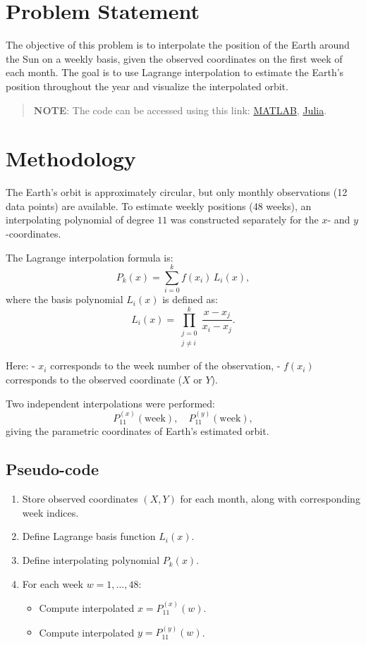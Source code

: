 \section*{Problem Statement}
The objective of this problem is to interpolate the position of the Earth around the Sun on a weekly basis, given the observed coordinates on the first week of each month. The goal is to use Lagrange interpolation to estimate the Earth’s position throughout the year and visualize the interpolated orbit.

\begin{quote}
  \textbf{NOTE}: The code can be accessed using this link: \href{https://raw.githubusercontent.com/HavokSahil/computational-techniques-assignments/refs/heads/main/assignment3/a2.m}{MATLAB}, \href{https://raw.githubusercontent.com/HavokSahil/computational-techniques-assignments/refs/heads/main/assignment3/a2.jl}{Julia}.
\end{quote}
\section*{Methodology}
The Earth’s orbit is approximately circular, but only monthly observations (12 data points) are available. To estimate weekly positions (48 weeks), an interpolating polynomial of degree $11$ was constructed separately for the $x$- and $y$-coordinates.

The Lagrange interpolation formula is:
\[
  P_k(x) = \sum_{i=0}^{k} f(x_i) \, L_i(x),
\]
where the basis polynomial $L_i(x)$ is defined as:
\[
  L_i(x) = \prod_{\substack{j=0 \\ j \neq i}}^{k} \frac{x - x_j}{x_i - x_j}.
\]

Here:
- $x_i$ corresponds to the week number of the observation,
- $f(x_i)$ corresponds to the observed coordinate ($X$ or $Y$).

Two independent interpolations were performed:
\[
P^{(x)}_{11}(\text{week}), \quad P^{(y)}_{11}(\text{week}),
\]
giving the parametric coordinates of Earth’s estimated orbit.

\subsection*{Pseudo-code}
\begin{enumerate}
  \item Store observed coordinates $(X, Y)$ for each month, along with corresponding week indices.
  \item Define Lagrange basis function $L_i(x)$.
  \item Define interpolating polynomial $P_k(x)$.
  \item For each week $w = 1, \dots, 48$:
    \begin{itemize}
      \item Compute interpolated $x = P^{(x)}_{11}(w)$.
      \item Compute interpolated $y = P^{(y)}_{11}(w)$.
    \end{itemize}
\end{enumerate}

